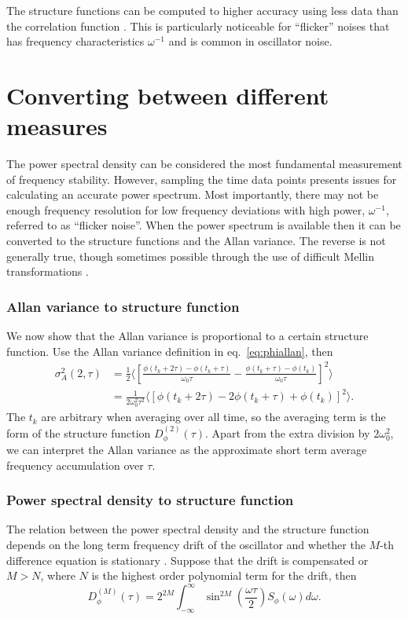 The structure functions can be computed to higher accuracy using less data than the correlation function \cite{Schulz-DuBois1981}. This is particularly noticeable for ``flicker'' noises that has frequency characteristics $\omega^{-1}$ and is common in oscillator noise.

\section{Converting between different measures} \label{sec:convert}
%
The power spectral density can be considered the most fundamental measurement of frequency stability. However, sampling the time data points presents issues for calculating an accurate power spectrum. Most importantly, there may not be enough frequency resolution for low frequency deviations with high power, $\omega^{-1}$, referred to as ``flicker noise''. When the power spectrum is available then it can be converted to the structure functions and the Allan variance. The reverse is not generally true, though sometimes possible through the use of difficult Mellin transformations \cite{Kartaschoff1978} \cite{Lindsey1976}.

\subsubsection*{Allan variance to structure function}
%
We now show that the Allan variance is proportional to a certain structure function. Use the Allan variance definition in eq.~\ref{eq:phiallan}, then
%
\begin{align} \label{eq:avtosf}
\sigma_A^2(2, \tau) &= \frac{1}{2}\bigg\langle \left[\frac{\phi(t_k+2\tau) - \phi(t_k+\tau)}{\omega_0\tau} - \frac{\phi(t_k+\tau) - \phi(t_k)}{\omega_0\tau}\right]^2 \bigg\rangle \\
&= \frac{1}{2\omega_0^2\tau^2} \langle\left[ \phi(t_k+2\tau) - 2\phi(t_k+\tau) + \phi(t_k) \right]^2\rangle.
\end{align}
%
The $t_k$ are arbitrary when averaging over all time, so the averaging term is the form of the structure function $D_\phi^{(2)}(\tau)$. Apart from the extra division by $2\omega_0^2$, we can interpret the Allan variance as the  approximate short term average frequency accumulation over $\tau$.

\subsubsection*{Power spectral density to structure function}
%
The relation between the power spectral density and the structure function depends on the long term frequency drift of the oscillator and whether the $M$-th difference equation is stationary \cite{Lindsey1976}. Suppose that the drift is compensated or $M > N$, where $N$ is the highest order polynomial term for the drift, then
%
\begin{equation}
	D_\phi^{(M)}(\tau) = 2^{2M}\int_{-\infty}^{\infty} \sin^{2M}\left( \frac{\omega\tau}{2}\right) S_\phi(\omega) d\omega.
\end{equation}

